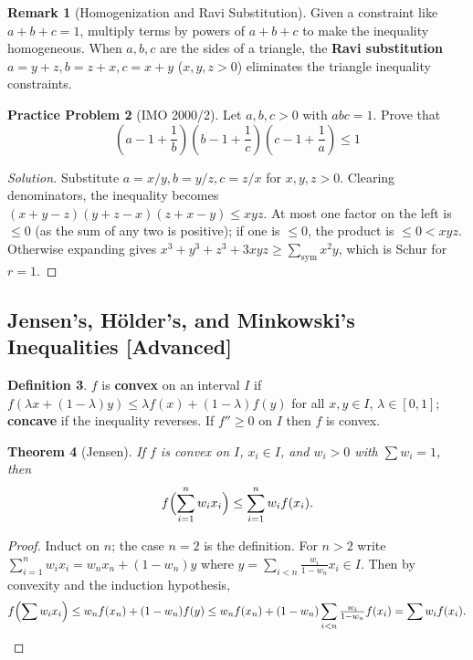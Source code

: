 \documentclass[11pt]{article}
\theoremstyle{plain}
\newtheorem{theorem}{Theorem}[section]
\theoremstyle{definition}
\newtheorem{definition}[theorem]{Definition}
\newtheorem{problem}[theorem]{Practice Problem}
\newtheorem{remark}[theorem]{Remark}
\newenvironment{solution}{\begin{proof}[Solution]}{\end{proof}}
\begin{document}
\begin{remark}[Homogenization and Ravi Substitution]
Given a constraint like $a+b+c=1$, multiply terms by powers of $a+b+c$ to make the inequality homogeneous. When $a,b,c$ are the sides of a triangle, the \textbf{Ravi substitution} $a = y+z, b = z+x, c = x+y$ ($x,y,z > 0$) eliminates the triangle inequality constraints.
\end{remark}

\begin{problem}[IMO 2000/2]
Let $a,b,c > 0$ with $abc = 1$. Prove that
$$\left(a - 1 + \frac{1}{b}\right)\left(b - 1 + \frac{1}{c}\right)\left(c - 1 + \frac{1}{a}\right) \le 1$$
\end{problem}
\begin{solution}
Substitute $a = x/y, b = y/z, c = z/x$ for $x,y,z > 0$. Clearing denominators, the inequality becomes
$(x+y-z)(y+z-x)(z+x-y) \le xyz$. At most one factor on the left is $\le 0$ (as the sum of any two is positive); if one is $\le 0$, the product is $\le 0 < xyz$. Otherwise expanding gives $x^3+y^3+z^3+3xyz \ge \sum_{\text{sym}}x^2y$, which is Schur for $r=1$.
\end{solution}

\subsection{Jensen's, Hölder's, and Minkowski's Inequalities [Advanced]}
\begin{definition}
$f$ is \textbf{convex} on an interval $I$ if
$f(\lambda x + (1-\lambda)y) \le \lambda f(x) + (1-\lambda) f(y)$ for all
$x,y \in I$, $\lambda \in [0,1]$; \textbf{concave} if the inequality reverses.
If $f'' \ge 0$ on $I$ then $f$ is convex.
\end{definition}

\begin{theorem}[Jensen]
If $f$ is convex on $I$, $x_i \in I$, and $w_i > 0$ with $\sum w_i = 1$, then
\[
f\Bigl(\sum_{i=1}^n w_i x_i\Bigr) \le \sum_{i=1}^n w_i f(x_i).
\]
\end{theorem}
\begin{proof}
Induct on $n$; the case $n=2$ is the definition. For $n>2$ write
$\sum_{i=1}^{n} w_i x_i = w_n x_n + (1-w_n) y$ where
$y = \sum_{i<n} \frac{w_i}{1-w_n} x_i \in I$. Then by convexity and the
induction hypothesis,
\[
f\Bigl(\sum w_i x_i\Bigr) \le w_n f(x_n) + (1-w_n) f(y)
\le w_n f(x_n) + (1-w_n)\sum_{i<n}\tfrac{w_i}{1-w_n}f(x_i)
= \sum w_i f(x_i). \qedhere
\]
\end{proof}
\end{document}

